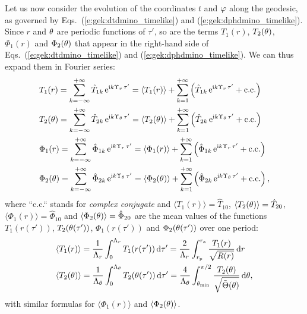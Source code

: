 Let us now consider the evolution of the coordinates $t$ and $\varphi$ along the
geodesic, as governed
by Eqs.~(\ref{e:gek:dtdmino_timelike}) and (\ref{e:gek:dphdmino_timelike}).
Since $r$ and $\theta$ are periodic functions of $\tau'$, so are the terms
$T_1(r)$, $T_2(\theta)$, $\Phi_1(r)$ and $\Phi_2(\theta)$ that appear in the right-hand side
of Eqs.~(\ref{e:gek:dtdmino_timelike}) and (\ref{e:gek:dphdmino_timelike}). We can thus expand them in Fourier series:
\begin{subequations}
\begin{align}
  &  T_1(r) = \sum_{k=-\infty}^{+\infty} \hat{T}_{1k} \, \mathrm{e}^{\mathrm{i} k \Upsilon_r \, \tau'} = \langle T_1(r) \rangle + \sum_{k=1}^{+\infty} \left( \hat{T}_{1k} \, \mathrm{e}^{\mathrm{i} k \Upsilon_r \, \tau'} + \mathrm{c.c.} \right) \\
  &  T_2(\theta) = \sum_{k=-\infty}^{+\infty} \hat{T}_{2k} \, \mathrm{e}^{\mathrm{i} k \Upsilon_\theta \, \tau'} = \langle T_2(\theta) \rangle + \sum_{k=1}^{+\infty} \left( \hat{T}_{2k} \, \mathrm{e}^{\mathrm{i} k \Upsilon_\theta \, \tau'} + \mathrm{c.c.} \right) \\
  &  \Phi_1(r) = \sum_{k=-\infty}^{+\infty} \hat{\Phi}_{1k} \, \mathrm{e}^{\mathrm{i} k \Upsilon_r \, \tau'} = \langle \Phi_1(r) \rangle + \sum_{k=1}^{+\infty} \left( \hat{\Phi}_{1k} \, \mathrm{e}^{\mathrm{i} k \Upsilon_r \, \tau'} + \mathrm{c.c.} \right) \\
  &  \Phi_2(\theta) = \sum_{k=-\infty}^{+\infty} \hat{\Phi}_{2k} \, \mathrm{e}^{\mathrm{i} k \Upsilon_\theta \, \tau'} = \langle \Phi_2(\theta) \rangle + \sum_{k=1}^{+\infty} \left( \hat{\Phi}_{2k} \, \mathrm{e}^{\mathrm{i} k \Upsilon_\theta \, \tau'} + \mathrm{c.c.} \right) ,
\end{align}
\end{subequations}
where ``c.c.`` stands for \emph{complex conjugate} and $\langle T_1(r) \rangle = \hat{T}_{10}$, $\langle T_2(\theta) \rangle = \hat{T}_{20}$,
$\langle \Phi_1(r) \rangle = \hat{\Phi}_{10}$ and $\langle \Phi_2(\theta) \rangle = \hat{\Phi}_{20}$
are the mean values of the functions $T_1(r(\tau'))$,
$T_2(\theta(\tau'))$, $\Phi_1(r(\tau'))$ and $\Phi_2(\theta(\tau'))$ over one period:
\begin{subequations}
\begin{align}
    & \langle T_1(r) \rangle = \frac{1}{\Lambda_r} \int_{0}^{\Lambda_r}
        T_1(r(\tau'))\, \mathrm{d} \tau'
        = \frac{2}{\Lambda_r} \int_{r_{\rm p}}^{r_{\rm a}} \frac{T_1(r)}{\sqrt{R(r)}}\, \mathrm{d} r \\
    & \langle T_2(\theta) \rangle = \frac{1}{\Lambda_\theta} \int_{0}^{\Lambda_\theta}
        T_2(\theta(\tau'))\, \mathrm{d} \tau'
        = \frac{4}{\Lambda_\theta} \int_{\theta_{\rm min}}^{\pi/2}
            \frac{T_2(\theta)}{\sqrt{\tilde\Theta(\theta)}}\, \mathrm{d} \theta ,
\end{align}
\end{subequations}
with similar formulas for $\langle \Phi_1(r) \rangle$ and $\langle \Phi_2(\theta) \rangle$.

